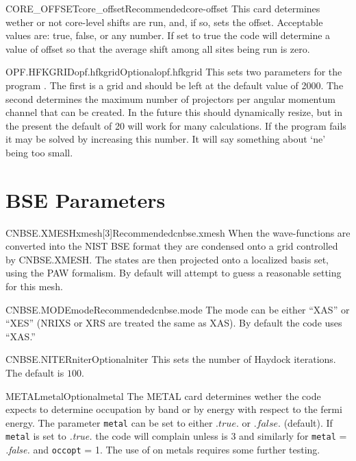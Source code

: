 \documentclass[11pt]{report}
\begin{document}
\begin{Card}{CORE\_OFFSET}{core\_offset}{Recommended}{core-offset}
This card determines wether or not core-level shifts are run, and, if so, sets the offset. Acceptable values are: true, false, or any number. If set to true the code will determine a value of offset so that the average shift among all sites being run is zero. 
\end{Card}

\begin{Card}{OPF.HFKGRID}{opf.hfkgrid}{Optional}{opf.hfkgrid}
This sets two parameters for the program . The first is a grid and should be left at the default value of 2000. The second determines the maximum number of projectors per angular momentum channel that can be created. In the future this should dynamically resize, but in the present the default of 20 will work for many calculations. If the program  fails it may be solved by increasing this number. It will say something about `ne' being too small. 
\end{Card}


\section{BSE Parameters}
\label{sec:BSE-Parameters}

\begin{Card}{CNBSE.XMESH}{xmesh[3]}{Recommended}{cnbse.xmesh}
When the wave-functions are converted into the NIST BSE format they are condensed onto a grid controlled by CNBSE.XMESH. The states are then projected onto a localized basis set, using the PAW formalism. By default  will attempt to guess a reasonable 
setting for this mesh. 
\end{Card}

\begin{Card}{CNBSE.MODE}{mode}{Recommended}{cnbse.mode}
The mode can be either ``XAS'' or ``XES'' (NRIXS or XRS are treated the same as XAS). By default the code uses ``XAS.''
\end{Card}

\begin{Card}{CNBSE.NITER}{niter}{Optional}{niter}
This sets the number of Haydock iterations. The default is $100$.
\end{Card}

\begin{Card}{METAL}{metal}{Optional}{metal}
The METAL card determines wether the code expects to determine occupation by band or by energy with respect to the fermi energy. The parameter \texttt{metal} can be set to either $.true.$ or $.false.$ (default). If \texttt{metal} is set to {\it .true.} the code will complain unless  is 3 and similarly for \texttt{metal} = {\it .false.} and \texttt{occopt} = 1. The use of  on metals requires some further testing. 
\end{Card}
\end{document}
